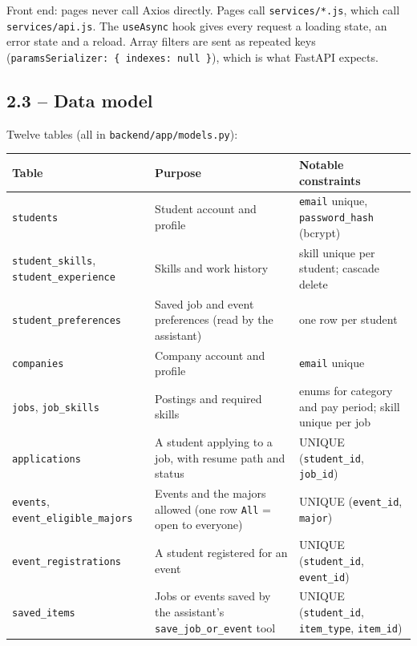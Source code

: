 \documentclass[11pt,letterpaper]{article}
\newcommand{\code}[1]{\texttt{#1}}
\begin{document}
Front end: pages never call Axios directly. Pages call \code{services/\allowbreak{}*.\allowbreak{}js}, which call \code{services/\allowbreak{}api.\allowbreak{}js}. The \code{useAsync} hook gives every request a loading state, an error state and a reload. Array filters are sent as repeated keys (\code{paramsSerializer:\allowbreak{} \{ indexes:\allowbreak{} null \}}), which is what FastAPI expects.

\subsection*{2.3 -- Data model}

Twelve tables (all in \code{backend/\allowbreak{}app/\allowbreak{}models.\allowbreak{}py}):

{\small
\begin{longtable}{>{\raggedright\arraybackslash}p{}>{\raggedright\arraybackslash}p{}>{\raggedright\arraybackslash}p{}}
\hline
\textbf{Table} & \textbf{Purpose} & \textbf{Notable constraints} \\ \hline
\endhead
\code{students} & Student account and profile & \code{email} unique, \code{password\_\allowbreak{}hash} (bcrypt) \\ \hline
\code{student\_\allowbreak{}skills}, \code{student\_\allowbreak{}experience} & Skills and work history & skill unique per student; cascade delete \\ \hline
\code{student\_\allowbreak{}preferences} & Saved job and event preferences (read by the assistant) & one row per student \\ \hline
\code{companies} & Company account and profile & \code{email} unique \\ \hline
\code{jobs}, \code{job\_\allowbreak{}skills} & Postings and required skills & enums for category and pay period; skill unique per job \\ \hline
\code{applications} & A student applying to a job, with resume path and status & UNIQUE (\code{student\_\allowbreak{}id}, \code{job\_\allowbreak{}id}) \\ \hline
\code{events}, \code{event\_\allowbreak{}eligible\_\allowbreak{}majors} & Events and the majors allowed (one row \code{All} = open to everyone) & UNIQUE (\code{event\_\allowbreak{}id}, \code{major}) \\ \hline
\code{event\_\allowbreak{}registrations} & A student registered for an event & UNIQUE (\code{student\_\allowbreak{}id}, \code{event\_\allowbreak{}id}) \\ \hline
\code{saved\_\allowbreak{}items} & Jobs or events saved by the assistant's \code{save\_\allowbreak{}job\_\allowbreak{}or\_\allowbreak{}event} tool & UNIQUE (\code{student\_\allowbreak{}id}, \code{item\_\allowbreak{}type}, \code{item\_\allowbreak{}id}) \\ \hline
\end{longtable}
}
\end{document}

